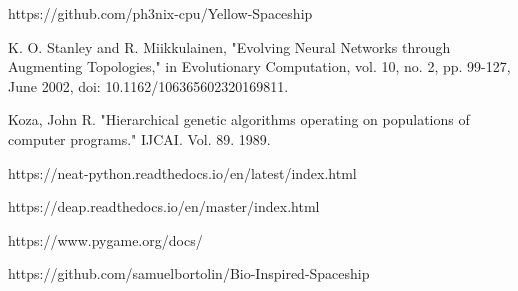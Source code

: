 \documentclass[journal]{IEEEtran}
\begin{document}
%
\IEEEpeerreviewmaketitle










\ifCLASSOPTIONcaptionsoff
  \newpage
\fi


%
%
%
\begin{thebibliography}{1}

https://github.com/ph3nix-cpu/Yellow-Spaceship

K. O. Stanley and R. Miikkulainen, "Evolving Neural Networks through Augmenting Topologies," in Evolutionary Computation, vol. 10, no. 2, pp. 99-127, June 2002, doi: 10.1162/106365602320169811.

Koza, John R. "Hierarchical genetic algorithms operating on populations of computer programs." IJCAI. Vol. 89. 1989.

https://neat-python.readthedocs.io/en/latest/index.html

https://deap.readthedocs.io/en/master/index.html

https://www.pygame.org/docs/

https://github.com/samuelbortolin/Bio-Inspired-Spaceship

\end{thebibliography}
\end{document}
